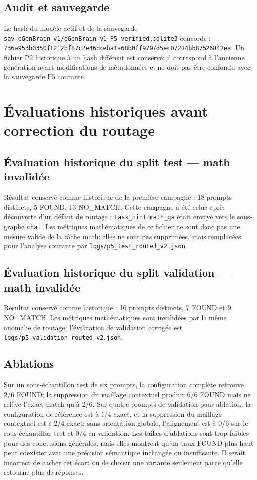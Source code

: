 \documentclass[11pt,a4paper,openany]{book}
\begin{document}
\section{Audit et sauvegarde}
Le hash du modèle actif et de la sauvegarde \texttt{sav\_eGenBrain\_v1/eGenBrain\_v1\_P5\_verified.sqlite3} concorde : \texttt{736a953b0350f1212bf87c2e46dceba1a68b0ff9797d5ec07214bb87526842ea}. Un fichier P2 historique à un hash différent est conservé; il correspond à l'ancienne génération avant modifications de métadonnées et ne doit pas être confondu avec la sauvegarde P5 courante.

\chapter{Évaluations historiques avant correction du routage}
\section{Évaluation historique du split test — math invalidée}
Résultat conservé comme historique de la première campagne : 18 prompts distincts, 5 FOUND, 13 NO\_MATCH. Cette campagne a été relue après découverte d'un défaut de routage : \texttt{task\_hint=math\_qa} était envoyé vers le sous-graphe \texttt{chat}. Les métriques mathématiques de ce fichier ne sont donc pas une mesure valide de la tâche math; elles ne sont pas supprimées, mais remplacées pour l'analyse courante par \texttt{logs/p5\_test\_routed\_v2.json}.

\section{Évaluation historique du split validation — math invalidée}
Résultat conservé comme historique : 16 prompts distincts, 7 FOUND et 9 NO\_MATCH. Les métriques mathématiques sont invalidées par la même anomalie de routage; l'évaluation de validation corrigée est \texttt{logs/p5\_validation\_routed\_v2.json}.

\section{Ablations}
Sur un sous-échantillon test de six prompts, la configuration complète retrouve 2/6 FOUND; la suppression du maillage contextuel produit 6/6 FOUND mais ne relève l'exact-match qu'à 2/6. Sur quatre prompts de validation pour ablation, la configuration de référence est à 1/4 exact, et la suppression du maillage contextuel est à 2/4 exact; sans orientation globale, l'alignement est à 0/6 sur le sous-échantillon test et 0/4 en validation. Les tailles d'ablations sont trop faibles pour des conclusions générales, mais elles montrent qu'un taux FOUND plus haut peut coexister avec une précision sémantique inchangée ou insuffisante. Il serait incorrect de cacher cet écart ou de choisir une variante seulement parce qu'elle retourne plus de réponses.
\end{document}
